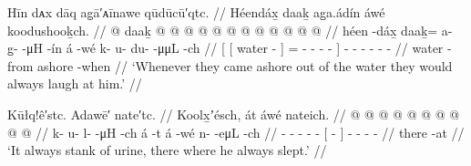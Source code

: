 \ex\label{ex:93-6-laugh-out-of-water}%
%
\begingl
	\glpreamble	Hīn dᴀx dāq ag̣ā′ᴀīnawe qūdūcū′qtc. //
	\glpreamble	Héendáx̱ daaḵ ag̱a.ádín áwé koodushooḵch. //
	\gla	{} {}  @ {} {}
			daaḵ @  @ {} @ {} @ {} @ {} @ {} {}
		 @ {}
		 @ {} @ {} @ {} @ {} @ {} //
	\glb	{} {} héen -dáx̱ {}
			daaḵ= a- {} g̱-  -μH -ín {}
		á -wé
		k- u- du-  -μμL -ch //
	\glc	{}[ {}[ water - {}]
			= - \· -  - - {}]
		 -
		- - -  - - //
	\gld	{} {} water -from {}
			ashore  {} {} {} {} -when {}
		 {}
		 {} {} {} {} {} //
	\glft	‘Whenever they came ashore out of the water they would always laugh at him.’
		//
\endgl
\xe

\ex\label{ex:93-7-urine-stink-sleep}%
%
\begingl
	\glpreamble	Kūłq!ê′stc.
Adawē′ nate′tc. //
	\glpreamble	Koolx̱ʼésch, át áwé nateich. //
	\gla	{} @ {} @ {} @ {} @ {} @ {} 
		{}  @ {} {}
		 @ {}
		 @ {} @ {} @ {} //
	\glb	k- u- l-  -μH -ch
		{} á -t {}
		á -wé
		n-  -eμL -ch //
	\glc	{}- - -  - -
		{}[  - {}]
		 -
		-  - - //
	\gld	{} {} {} {} {} {}
		{} there -at {}
		 {}
		 {} {} {} //
	\glft	‘It always stank of urine, there where he always slept.’
		//
\endgl
\xe

